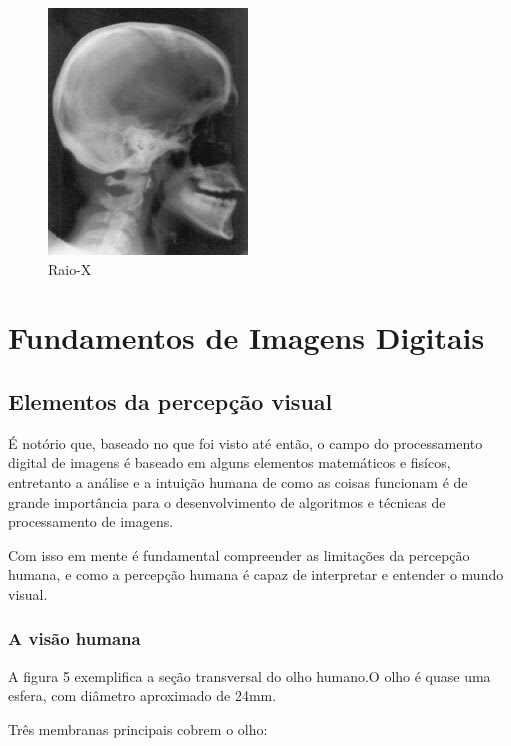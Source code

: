 \documentclass[12pt]{article}
\begin{document}
\begin{figure}[h]
    \centering
    \includegraphics{images/4.jpeg}
    \caption{Raio-X}
    \label{fig:exemplo}
\end{figure}

\section{Fundamentos de Imagens Digitais}

\subsection{Elementos da percepção visual}

É notório que, baseado no que foi visto até então, o campo do processamento digital de imagens é baseado
em alguns elementos matemáticos e fisícos, entretanto a análise e a intuição humana de como as coisas
funcionam é de grande importância para o desenvolvimento de algoritmos e técnicas de processamento de
imagens.

Com isso em mente é fundamental compreender as limitações da percepção humana, e como a percepção
humana é capaz de interpretar e entender o mundo visual.

\subsubsection{A visão humana}

A figura 5 exemplifica a seção transversal do olho humano.O olho é quase uma esfera, com diâmetro
aproximado de 24mm.

Três membranas principais cobrem o olho:
\end{document}
